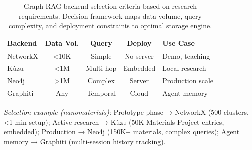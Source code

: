 \begin{table}[htbp]
\centering
\caption{Graph RAG backend selection criteria based on research requirements. Decision framework maps data volume, query complexity, and deployment constraints to optimal storage engine.}
\label{tab:graphrag}
\scriptsize
\begin{tabular}{@{}lcccp{3cm}@{}}
\toprule
\textbf{Backend} & \textbf{Data Vol.} & \textbf{Query} & \textbf{Deploy} & \textbf{Use Case} \\
\midrule
NetworkX & <10K & Simple & No server & Demo, teaching \\
Kùzu & <1M & Multi-hop & Embedded & Local research \\
Neo4j & >1M & Complex & Server & Production scale \\
Graphiti & Any & Temporal & Cloud & Agent memory \\
\bottomrule
\end{tabular}

\vspace{0.3cm}
\footnotesize
\textit{Selection example (nanomaterials):} Prototype phase → NetworkX (500 clusters, <1 min setup); Active research → Kùzu (50K Materials Project entries, embedded); Production → Neo4j (150K+ materials, complex queries); Agent memory → Graphiti (multi-session history tracking).
\end{table}
